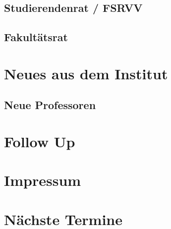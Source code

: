 \documentclass{fsinewsletter}
\begin{document}

\subsection{Studierendenrat / FSRVV}


\subsection{Fakultätsrat}

\newpage
\section{Neues aus dem Institut}

\subsection{Neue Professoren}


\newpage

\section{Follow Up}


\newpage
\section{Impressum}


%
\newpage
\section{Nächste Termine}

\end{document}
